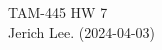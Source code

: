 \documentclass[12pt]{article}
\begin{document}
\noindent TAM-445 \hfill HW 7\\
Jerich Lee. (2024-04-03)

\hrulefill




\end{document}
